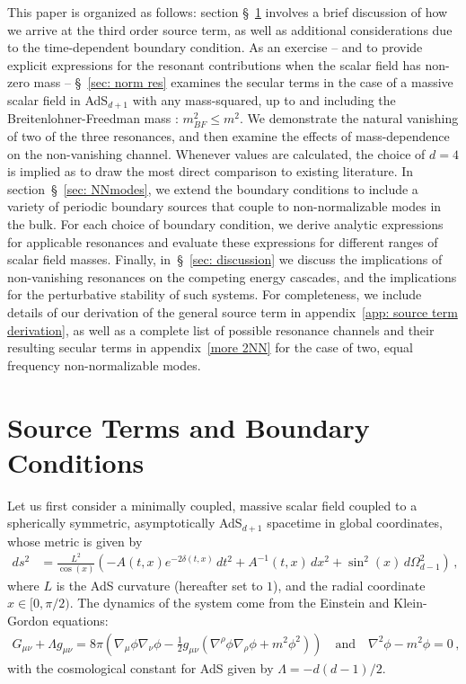 \documentclass[letterpaper,11pt]{article}
\begin{document}
This paper is organized as follows: section \S\!~\ref{sec: source terms and BCs} involves a brief discussion of how we arrive at the third order source term, as well as additional considerations due to the time-dependent boundary condition. As an exercise -- and to provide explicit expressions for the resonant contributions when the scalar field has non-zero mass -- \S\!~\ref{sec: norm res} examines the secular terms in the case of a massive scalar field in AdS$_{d+1}$ with any mass-squared, up to and including the Breitenlohner-Freedman mass \cite{Breitenlohner:1982bm}: $m^2_{BF} \leq m^2$. We demonstrate the natural vanishing of two of the three resonances, and then examine the effects of mass-dependence on the non-vanishing channel. Whenever values are calculated, the choice of $d=4$ is implied as to draw the most direct comparison to existing literature. In section~\S\!~\ref{sec: NNmodes}, we extend the boundary conditions to include a variety of periodic boundary sources that couple to non-normalizable modes in the bulk. For each choice of boundary condition, we derive analytic expressions for applicable resonances and evaluate these expressions for different ranges of scalar field masses. Finally, in~\S\!~\ref{sec: discussion} we discuss the implications of non-vanishing resonances on the competing energy cascades, and the implications for the perturbative stability of such systems. For completeness, we include details of our derivation of the general source term in appendix~\ref{app: source term derivation}, as well as a complete list of possible resonance channels and their resulting secular terms in appendix~\ref{more 2NN} for the case of two, equal frequency non-normalizable modes.


\section{Source Terms and Boundary Conditions}
\label{sec: source terms and BCs}

Let us first consider a minimally coupled, massive scalar field coupled to a spherically symmetric, asymptotically AdS$_{d+1}$ spacetime in global coordinates, whose metric is given by
\begin{align}
\label{AdS metric}
ds^2 &= \frac{L^2}{\cos(x)} \left( - A(t,x) e^{-2 \delta(t,x)} \, dt^2 + A^{-1}(t, x) \, dx^2 + \sin^2 (x) \, d\Omega^2_{d-1} \right) \, ,
\end{align}
where $L$ is the AdS curvature (hereafter set to $1$), and the radial coordinate $x \in [0, \pi/2)$. The dynamics of the system come from the Einstein and Klein-Gordon equations:
\begin{align}
G_{\mu \nu} + \Lambda g_{\mu \nu} = 8 \pi \left( \nabla_\mu \phi \nabla_\nu \phi - \frac{1}{2} g_{\mu \nu} \left( \nabla^\rho \phi \nabla_\rho \phi + m^2 \phi^2 \right) \right) \quad \text{and} \quad \nabla^2 \phi - m^2 \phi = 0 \, ,
\end{align}
with the cosmological constant for AdS given by $\Lambda = -d(d-1)/2$. 
\end{document}
